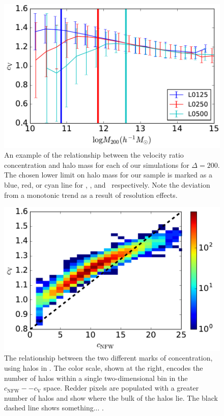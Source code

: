 \documentclass[usenatbib]{mnras}
\begin{document}
\begin{figure}
\centering
\includegraphics[width=.5\textwidth]{masscut_cV_d200.pdf}
\caption{An example of the relationship between the velocity ratio concentration and halo mass for each of our simulations for $\Delta =200$. The chosen lower limit on halo mass for our sample is marked as a blue, red, or cyan line for \simA, \simB, and \simC \ respectively. Note the deviation from a monotonic trend as a result of resolution effects. 
}
\label{fig:cvrelation}
\end{figure}

\begin{figure}
\centering
\includegraphics[width=.5\textwidth]{cvvscnfw_relation.pdf}
\caption{
The relationship between the two different marks of concentration, 
using halos in \simB. The color scale, shown at the right, encodes the number of halos 
within a single two-dimensional bin in the $c_{\mathrm{NFW}}--c_{\mathrm{V}}$ space. 
Redder pixels are populated with a greater number of halos and show where the bulk of the 
halos lie. The black dashed line shows something... . 
}
\label{fig:concentrations}
\end{figure}
\end{document}
